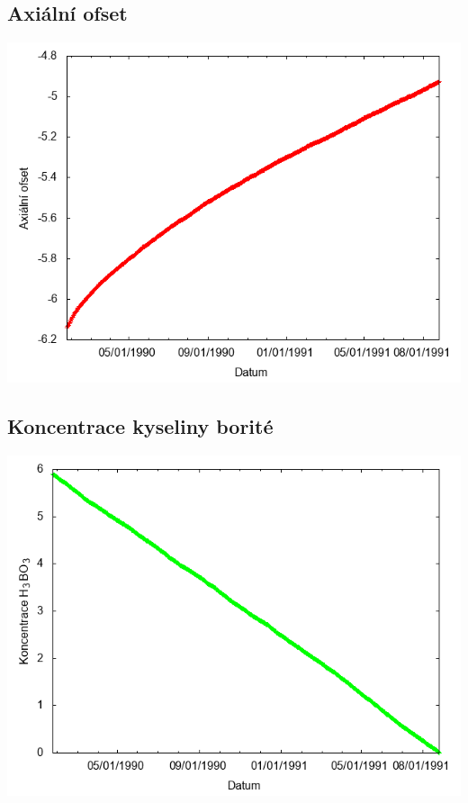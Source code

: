 \documentclass[a4paper,twoside,11pt]{article}
\begin{document}
\subsection*{Axiální ofset}
\begin{center}
\includegraphics[width=.8\textwidth]{graphs/Disneyland_07_ao.png}
\end{center}

\subsection*{Koncentrace kyseliny borité}
\begin{center}
\includegraphics[width=.8\textwidth]{graphs/Disneyland_07_bc.png}
\end{center}
\end{document}
